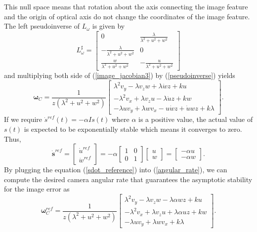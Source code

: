 This null space means that rotation about the axis connecting the image feature and the origin of optical axis do not change the coordinates of the image feature. The left pseudoinverse of $L_{\omega}$ is given by 
\begin{equation}
L_{\omega}^\sharp=\begin{bmatrix}
0 & \frac{\lambda}{\lambda^2+u^2+w^2} \\
-\frac{\lambda}{\lambda^2+u^2+w^2} & 0 \\
\frac{w}{\lambda^2+u^2+w^2} & -\frac{u}{\lambda^2+u^2+w^2}
\end{bmatrix}
\label{pseudoinverse}
\end{equation}
and multiplying both side of (\ref{image_jacobian3}) by (\ref{pseudoinverse}) yields
\begin{equation}
\mathbf{\omega}_C=\frac{1}{z(\lambda^2+u^2+w^2)}\begin{bmatrix}
\lambda^2 v_y-\lambda v_z w+\lambda \dot{w}z+ku \\
-\lambda^2 v_x+\lambda v_zu-\lambda \dot{u}z+kw \\
-\lambda u v_y+\lambda w v_x-u\dot{w}z+\dot{u}wz+k\lambda
\end{bmatrix}.
\label{angular_rate}
\end{equation}
If we require $\dot{s}^{ref}(t)=-\alpha Is(t)$ where $\alpha$ is a positive value, the actual value of $s(t)$ is expected to be exponentially stable which means it converges to zero. Thus, 
\begin{equation}
\mathbf{\dot{s}}^{ref}=\begin{bmatrix}
\dot{u}^{ref} \\ \dot{w}^{ref}
\end{bmatrix}
=-\alpha \begin{bmatrix}
1 & 0 \\ 0 & 1
\end{bmatrix}
\begin{bmatrix}
u \\ w
\end{bmatrix}
=\begin{bmatrix}
-\alpha u \\ -\alpha w
\end{bmatrix}.
\label{sdot_reference}
\end{equation}
By plugging the equation (\ref{sdot_reference}) into (\ref{angular_rate}), we can compute the desired camera angular rate that guarantees the asymptotic stability for the image error as
\begin{equation}
\mathbf{\omega}_C^{ref}=\frac{1}{z(\lambda^2+u^2+w^2)}\begin{bmatrix}
\lambda^2 v_y-\lambda v_z w -\lambda \alpha wz+ku \\
-\lambda^2 v_x+\lambda v_zu +\lambda \alpha uz+kw \\
-\lambda u v_y+\lambda w v_x +k\lambda
\end{bmatrix}.
\label{angular_rate_reference}
\end{equation}
